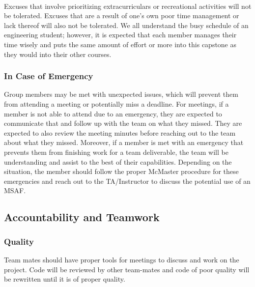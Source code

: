 \documentclass{article}
\begin{document}
\\Excuses that involve prioritizing extracurriculars or recreational activities will not be tolerated.
Excuses that are a result of one's own poor time management or lack thereof will also not be tolerated.
We all understand the busy schedule of an engineering student; however, it is expected that each member manages their time wisely and puts the same amount of effort or more into this capstone as they would into their other courses.



\subsubsection*{In Case of Emergency}


Group members may be met with unexpected issues, which will prevent them 
from attending a meeting or potentially miss a deadline. For meetings, 
if a member is not able to attend due to an emergency, they are expected 
to communicate that and follow up with the team on what they missed. 
They are expected to also review the meeting minutes before reaching 
out to the team about what they missed. Moreover, if a member is met 
with an emergency that prevents them from finishing work for a team 
deliverable, the team will be understanding and assist to the best 
of their capabilities. Depending on the situation, the member should 
follow the proper McMaster procedure for these emergencies and reach 
out to the TA/Instructor to discuss the potential use of an MSAF.

\subsection*{Accountability and Teamwork}

\subsubsection*{Quality} 

Team mates should have proper tools for meetings to discuss and work 
on the project.
Code will be reviewed by other team-mates and code of poor quality 
will be rewritten  until it is of proper quality.
\end{document}
